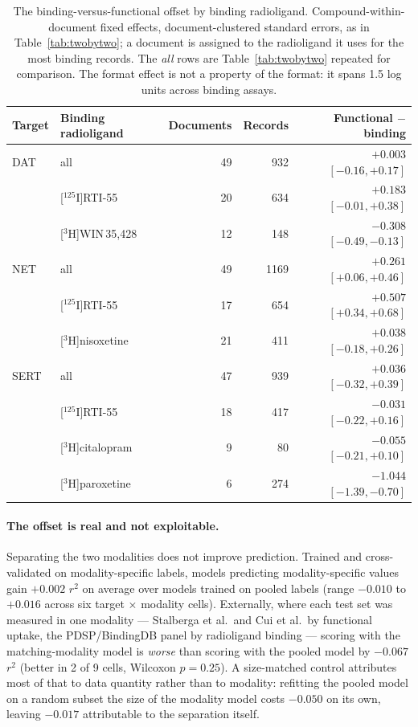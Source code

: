 \documentclass[11pt,a4paper]{article}
\begin{document}
\begin{table}[tb]
\centering
\small
\caption{The binding-versus-functional offset by binding radioligand. Compound-within-document
fixed effects, document-clustered standard errors, as in Table~\ref{tab:twobytwo}; a
document is assigned to the radioligand it uses for the most binding records. The
\emph{all} rows are Table~\ref{tab:twobytwo} repeated for comparison. The format effect
is not a property of the format: it spans 1.5 log units across binding assays.}
\label{tab:radioligand}
\begin{tabular}{llrrr}
\toprule
Target & Binding radioligand & Documents & Records & Functional $-$ binding \\
\midrule
DAT  & all                      & 49 &  932 & $+0.003$ $[-0.16,+0.17]$ \\
     & [$^{125}$I]RTI-55        & 20 &  634 & $+0.183$ $[-0.01,+0.38]$ \\
     & [$^{3}$H]WIN\,35,428     & 12 &  148 & $-0.308$ $[-0.49,-0.13]$ \\
\midrule
NET  & all                      & 49 & 1169 & $\mathbf{+0.261}$ $[+0.06,+0.46]$ \\
     & [$^{125}$I]RTI-55        & 17 &  654 & $\mathbf{+0.507}$ $[+0.34,+0.68]$ \\
     & [$^{3}$H]nisoxetine      & 21 &  411 & $\mathbf{+0.038}$ $[-0.18,+0.26]$ \\
\midrule
SERT & all                      & 47 &  939 & $+0.036$ $[-0.32,+0.39]$ \\
     & [$^{125}$I]RTI-55        & 18 &  417 & $-0.031$ $[-0.22,+0.16]$ \\
     & [$^{3}$H]citalopram      &  9 &   80 & $-0.055$ $[-0.21,+0.10]$ \\
     & [$^{3}$H]paroxetine      &  6 &  274 & $-1.044$ $[-1.39,-0.70]$ \\
\bottomrule
\end{tabular}
\end{table}

\paragraph{The offset is real and not exploitable.} Separating the two modalities does
not improve prediction. Trained and cross-validated on modality-specific labels, models
predicting modality-specific values gain $+0.002$ $r^{2}$ on average over models trained
on pooled labels (range $-0.010$ to $+0.016$ across six target $\times$ modality cells).
Externally, where each test set was measured in one modality --- Stalberga et al.\ and
Cui et al.\ by functional uptake, the PDSP/BindingDB panel by radioligand binding ---
scoring with the matching-modality model is \emph{worse} than scoring with the pooled
model by $-0.067$ $r^{2}$ (better in 2 of 9 cells, Wilcoxon $p=0.25$). A size-matched
control attributes most of that to data quantity rather than to modality: refitting the
pooled model on a random subset the size of the modality model costs $-0.050$ on its
own, leaving $-0.017$ attributable to the separation itself.
\end{document}
